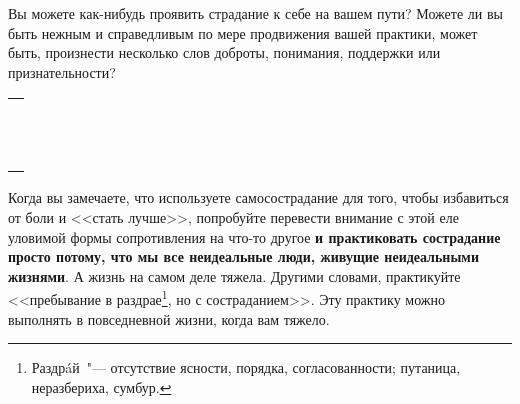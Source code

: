 \begin{itemize}
	\itemWritingHand Вы можете как-нибудь проявить страдание к себе на вашем пути? Можете ли вы быть нежным и справедливым по мере продвижения вашей практики, может быть, произнести несколько слов доброты, понимания, поддержки или признательности?
\end{itemize}
\setlength{\extrarowheight}{2mm}
\begin{tabularx}{\textwidth}{X}
	\\
	\arrayrulecolor{gray}\hline\\
	\hline\\
	\hline\\
	\hline\\
	\hline\\
	\hline\\	
	\hline\\
	\hline\\
	\hline\\
	\hline\\
	\hline\\
	\hline\\
	\hline\\
\end{tabularx}
\setlength{\extrarowheight}{0mm}


\newpage
{} \label{Being_a_Compassionate_Mess}

Когда вы замечаете, что используете самосострадание для того, чтобы избавиться от боли и <<стать лучше>>, попробуйте перевести внимание с этой еле уловимой формы сопротивления на что-то другое \textbf{и практиковать сострадание просто потому, что мы все неидеальные люди, живущие неидеальными жизнями}. А жизнь на самом деле тяжела. Другими словами, практикуйте <<пребывание в раздрае\footnote{Раздр\'{a}й~"--- отсутствие ясности, порядка, согласованности; путаница, неразбериха, сумбур.}, но с состраданием>>. Эту практику можно выполнять в повседневной жизни, когда вам тяжело. 

